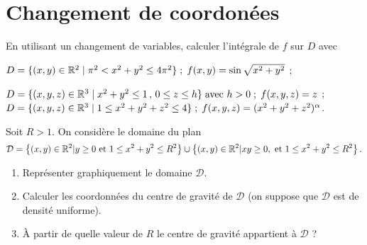 \documentclass{tp_um}
\begin{document}
\section{Changement de coordonées}

\exo{} En utilisant un changement de variables, calculer l'int\'egrale de $f$ sur $D$ avec
\begin{modenumerate}
\item $D=\{ (x,y)\in \mathbb{R}^2 \mid \pi^2 < x^2+y^2 \leq 4\pi^2 \}\; ;\; f(x,y)=\sin \sqrt{x^2+y^2}$ ;
\item $D=\{ (x,y,z)\in \mathbb{R}^3 \mid x^2+y^2 \leq 1\, ,\, 0\leq z\leq h \}\; \mbox{avec }h>0 \; ;\; f(x,y,z)=z$ ;
    \moditem{*} $D=\{ (x,y,z)\in \mathbb{R}^3 \mid 1\leq x^2+y^2+z^2 \leq 4 \}\; ;\; f(x,y,z)=(x^2+y^2+z^2)^\alpha $.
\end{modenumerate}

\bigskip


\bigskip

\exo{}
Soit $R > 1$. On considère le domaine du plan  \[\mathcal D = \left\{ (x,y) \in \mathbb{R}^2 | y \geq 0 \text{ et } 1 \leq x^2 + y^2  \leq R^2 \right\} \cup \left\{ (x,y)\in\mathbb{R}^2 | xy\geq 0, \text{ et } 1 \leq x^2+y^2 \leq R^2\right\}.\]
\begin{enumerate}
	\item Représenter graphiquement le domaine $\mathcal D$.
	\item Calculer les coordonnées du centre de gravité de  $\mathcal D$ (on suppose que $\mathcal D$ est de densité uniforme).
	\item À partir de quelle valeur de $R$ le centre de gravité appartient à $\mathcal D$ ?
\end{enumerate}

\bigskip
\end{document}
